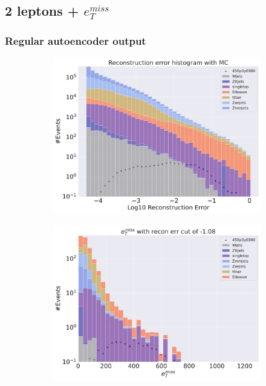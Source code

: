 \subsection*{2 leptons + $e_T^{miss}$}

\subsubsection*{Regular autoencoder output}



\begin{figure}[H]
    \centering
    \begin{subfigure}{.40\textwidth}
        \includegraphics[width=\textwidth]{Figures/AE_testing/small/2lep/b_data_recon_big_rm3_feats_sig_450p0p0300_.pdf}
        \caption{ }
        \label{fig:AE_2lep_big_450_2}
    \end{subfigure}
    \hfill
    \begin{subfigure}{.40\textwidth}
        \includegraphics[width=\textwidth]{Figures/AE_testing/big/2lep/b_data_recon_big_rm3_feats_sig_450p0p0300_recon_errcut_-1.08.pdf}

\end{subfigure}
\end{figure}
